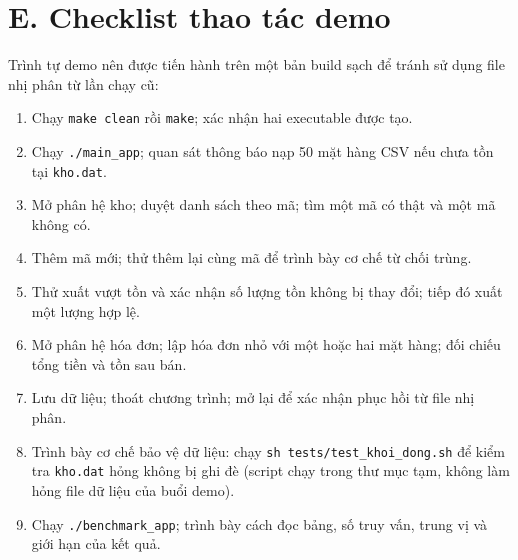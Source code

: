 \section*{E. Checklist thao tác demo}
Trình tự demo nên được tiến hành trên một bản build sạch để tránh sử dụng file nhị phân từ lần chạy cũ:
\begin{enumerate}
  \item Chạy \texttt{make clean} rồi \texttt{make}; xác nhận hai executable được tạo.
  \item Chạy \texttt{./main\_app}; quan sát thông báo nạp 50 mặt hàng CSV nếu chưa tồn tại \texttt{kho.dat}.
  \item Mở phân hệ kho; duyệt danh sách theo mã; tìm một mã có thật và một mã không có.
  \item Thêm mã mới; thử thêm lại cùng mã để trình bày cơ chế từ chối trùng.
  \item Thử xuất vượt tồn và xác nhận số lượng tồn không bị thay đổi; tiếp đó xuất một lượng hợp lệ.
  \item Mở phân hệ hóa đơn; lập hóa đơn nhỏ với một hoặc hai mặt hàng; đối chiếu tổng tiền và tồn sau bán.
  \item Lưu dữ liệu; thoát chương trình; mở lại để xác nhận phục hồi từ file nhị phân.
  \item Trình bày cơ chế bảo vệ dữ liệu: chạy \texttt{sh tests/test\_khoi\_dong.sh} để kiểm tra \texttt{kho.dat} hỏng không bị ghi đè (script chạy trong thư mục tạm, không làm hỏng file dữ liệu của buổi demo).
  \item Chạy \texttt{./benchmark\_app}; trình bày cách đọc bảng, số truy vấn, trung vị và giới hạn của kết quả.
\end{enumerate}

